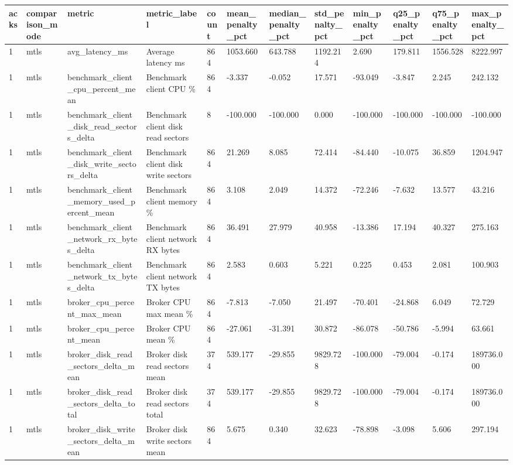 \begin{longtable}{llllllllllll}
\hline
acks & comparison\_mode & metric & metric\_label & count & mean\_penalty\_pct & median\_penalty\_pct & std\_penalty\_pct & min\_penalty\_pct & q25\_penalty\_pct & q75\_penalty\_pct & max\_penalty\_pct \\
\hline
1 & mtls & avg\_latency\_ms & Average latency ms & 864 & 1053.660 & 643.788 & 1192.214 & 2.690 & 179.811 & 1556.528 & 8222.997 \\
1 & mtls & benchmark\_client\_cpu\_percent\_mean & Benchmark client CPU \% & 864 & -3.337 & -0.052 & 17.571 & -93.049 & -3.847 & 2.245 & 242.132 \\
1 & mtls & benchmark\_client\_disk\_read\_sectors\_delta & Benchmark client disk read sectors & 8 & -100.000 & -100.000 & 0.000 & -100.000 & -100.000 & -100.000 & -100.000 \\
1 & mtls & benchmark\_client\_disk\_write\_sectors\_delta & Benchmark client disk write sectors & 864 & 21.269 & 8.085 & 72.414 & -84.440 & -10.075 & 36.859 & 1204.947 \\
1 & mtls & benchmark\_client\_memory\_used\_percent\_mean & Benchmark client memory \% & 864 & 3.108 & 2.049 & 14.372 & -72.246 & -7.632 & 13.577 & 43.216 \\
1 & mtls & benchmark\_client\_network\_rx\_bytes\_delta & Benchmark client network RX bytes & 864 & 36.491 & 27.979 & 40.958 & -13.386 & 17.194 & 40.327 & 275.163 \\
1 & mtls & benchmark\_client\_network\_tx\_bytes\_delta & Benchmark client network TX bytes & 864 & 2.583 & 0.603 & 5.221 & 0.225 & 0.453 & 2.081 & 100.903 \\
1 & mtls & broker\_cpu\_percent\_max\_mean & Broker CPU max mean \% & 864 & -7.813 & -7.050 & 21.497 & -70.401 & -24.868 & 6.049 & 72.729 \\
1 & mtls & broker\_cpu\_percent\_mean & Broker CPU mean \% & 864 & -27.061 & -31.391 & 30.872 & -86.078 & -50.786 & -5.994 & 63.661 \\
1 & mtls & broker\_disk\_read\_sectors\_delta\_mean & Broker disk read sectors mean & 374 & 539.177 & -29.855 & 9829.728 & -100.000 & -79.004 & -0.174 & 189736.000 \\
1 & mtls & broker\_disk\_read\_sectors\_delta\_total & Broker disk read sectors total & 374 & 539.177 & -29.855 & 9829.728 & -100.000 & -79.004 & -0.174 & 189736.000 \\
1 & mtls & broker\_disk\_write\_sectors\_delta\_mean & Broker disk write sectors mean & 864 & 5.675 & 0.340 & 32.623 & -78.898 & -3.098 & 5.606 & 297.194 \\

\end{longtable}
